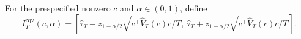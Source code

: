 For the prespecified nonzero \(c\) and \(\alpha\in(0,1)\), define
\[
 I_T^{\mathrm{rqv}}(c,\alpha)=
 \left[\widehat\tau_T-z_{1-\alpha/2}
 \sqrt{c^\top\widehat V_T(c)c/T},\ 
 \widehat\tau_T+z_{1-\alpha/2}
 \sqrt{c^\top\widehat V_T(c)c/T}\right].
\]